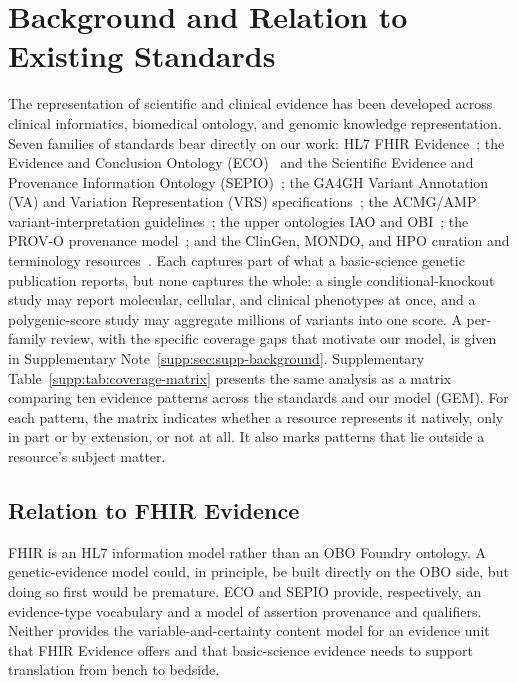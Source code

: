 \section{Background and Relation to Existing Standards}
\label{sec:background}

The representation of scientific and clinical evidence has been developed
across clinical informatics, biomedical ontology, and genomic knowledge
representation. Seven families of standards bear directly on our work: HL7 FHIR
Evidence~\cite{fhir_evidence}; the Evidence and Conclusion Ontology
(ECO)~\cite{eco2019} and the Scientific Evidence and Provenance Information
Ontology (SEPIO)~\cite{sepio}; the GA4GH Variant Annotation (VA) and Variation
Representation (VRS) specifications~\cite{ga4gh_va,ga4gh_vrs}; the ACMG/AMP
variant-interpretation guidelines~\cite{acmg2015}; the upper ontologies IAO
and OBI~\cite{iao2015,obi2016}; the PROV-O provenance model~\cite{prov_o};
and the ClinGen, MONDO, and HPO
curation and terminology resources~\cite{clingen2018,mondo,hpo}. Each captures
part of what a basic-science genetic publication reports, but none captures the
whole: a single conditional-knockout study may report molecular, cellular, and
clinical phenotypes at once, and a polygenic-score study may aggregate millions
of variants into one score. A per-family review, with the specific coverage
gaps that motivate our model,
is given in Supplementary Note~\ref*{supp:sec:supp-background}.
Supplementary Table~\ref*{supp:tab:coverage-matrix} presents the same
analysis as a matrix comparing ten evidence patterns across the standards
and our model (GEM). For each pattern, the matrix indicates whether a resource
represents it natively, only in part or by extension, or not at all. It
also marks patterns that lie outside a resource's subject matter.

\subsection{Relation to FHIR Evidence}
\label{sec:background-fhir}

FHIR is an HL7 information model rather than an OBO Foundry ontology. A
genetic-evidence model could, in principle, be built directly on the OBO
side, but doing so first would be premature. ECO and SEPIO provide,
respectively, an evidence-type vocabulary and a model of assertion
provenance and qualifiers.
Neither provides the variable-and-certainty content model for an evidence
unit that FHIR Evidence offers and that basic-science evidence needs to
support translation from bench to bedside.

